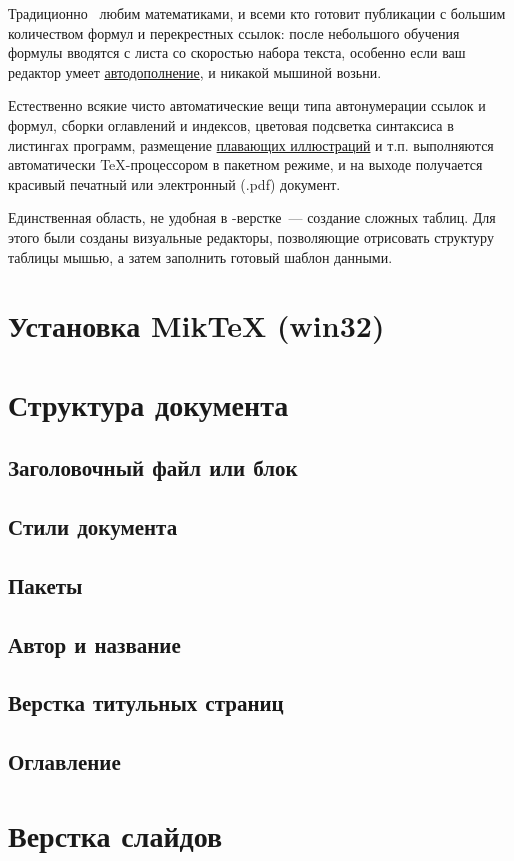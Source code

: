 Традиционно \latex\ любим математиками, и всеми кто готовит публикации с большим
количеством формул и перекрестных ссылок: после небольшого обучения формулы
вводятся с листа со скоростью набора текста, особенно если ваш редактор умеет
\hyperref[autocomplition]{автодополнение}, и никакой мышиной возьни.

Естественно всякие чисто автоматические вещи типа автонумерации ссылок и формул,
сборки оглавлений и индексов, цветовая подсветка синтаксиса в листингах
программ, размещение \hyperref[floatfig]{плавающих иллюстраций} и т.п.
выполняются автоматически \TeX-процессором в пакетном режиме, и на выходе
получается красивый печатный или электронный (.pdf) документ.

Единственная область, не удобная в \latex-верстке\ --- создание сложных таблиц.
Для этого были созданы визуальные редакторы, позволяющие отрисовать структуру
таблицы мышью, а затем заполнить готовый шаблон данными.

\section{Установка MikTeX (win32)}
\section{Структура документа}
\subsection{Заголовочный файл или блок}
\subsection{Стили документа}
\subsection{Пакеты}
\subsection{Автор и название}
\subsection{Верстка титульных страниц}
\subsection{Оглавление}
\section{Верстка слайдов}
